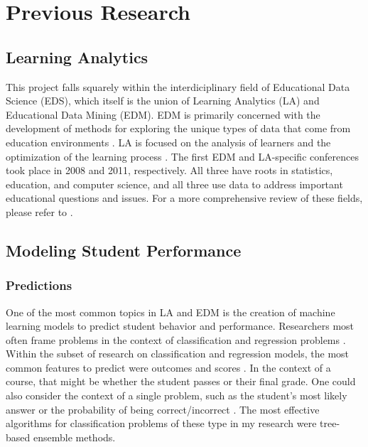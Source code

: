 \documentclass{article}
\begin{document}
\section{Previous Research}
    \subsection{Learning Analytics}
        This project falls squarely within the interdiciplinary field of Educational Data Science (EDS), which itself is the union of Learning Analytics (LA) and Educational Data Mining (EDM).
        EDM is primarily concerned with the development of methods for exploring the unique types of data that come from education environments \cite{educate2019}.
        LA is focused on the analysis of learners and the optimization of the learning process \cite{educate2019}.
        The first EDM and LA-specific conferences took place in 2008 and 2011, respectively. 
        All three have roots in statistics, education, and computer science, and all three use data to address important educational questions and issues.
        For a more comprehensive review of these fields, please refer to \cite{educate2007,educate2010,educate2019}.

    \subsection{Modeling Student Performance}
        \subsubsection{Predictions}
            One of the most common topics in LA and EDM is the creation of machine learning models to predict student behavior and performance.
            Researchers most often frame problems in the context of classification and regression problems \cite{educate2007,educate2010,educate2019}.
            Within the subset of research on classification and regression models, the most common features to predict were outcomes and scores \cite{compare2015}.
            In the context of a course, that might be whether the student passes or their final grade.
            One could also consider the context of a single problem, such as the student's most likely answer or the probability of being correct/incorrect \cite{explore2021}.
            The most effective algorithms for classification problems of these type in my research were tree-based ensemble methods.
\end{document}
